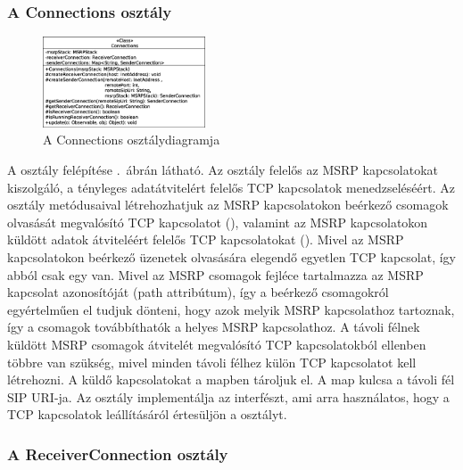 \subsubsection*{A Connections osztály}
\label{sec:msrp_connections}

\begin{figure}
  \vspace{-15pt}
  \begin{center}
    \includegraphics[width=0.43\textwidth]{img/class_diagrams/Connections.eps}
  \end{center}
  \vspace{-15pt}
  \captionsetup{font=scriptsize}
  \caption{A Connections osztálydiagramja}
   \label{fig:class_connections}
  \vspace{-10pt}
\end{figure}
A  osztály felépítése .~ábrán látható. Az osztály felelős az MSRP kapcsolatokat kiszolgáló, a tényleges adatátvitelért felelős TCP kapcsolatok menedzseléséért. Az osztály metódusaival létrehozhatjuk az MSRP kapcsolatokon beérkező csomagok olvasását megvalósító TCP kapcsolatot (), valamint az MSRP kapcsolatokon küldött adatok átviteléért felelős TCP kapcsolatokat (). Mivel az MSRP kapcsolatokon beérkező üzenetek olvasására elegendő egyetlen TCP kapcsolat, így abból csak egy van. Mivel az MSRP csomagok fejléce tartalmazza az MSRP kapcsolat azonosítóját (path attribútum), így a beérkező csomagokról egyértelműen el tudjuk dönteni, hogy azok melyik MSRP kapcsolathoz tartoznak, így a csomagok továbbíthatók a helyes MSRP kapcsolathoz. A távoli félnek küldött MSRP csomagok átvitelét megvalósító TCP kapcsolatokból ellenben többre van szükség, mivel minden távoli félhez külön TCP kapcsolatot kell létrehozni. A küldő kapcsolatokat a  mapben tároljuk el. A map kulcsa a távoli fél SIP URI-ja. Az osztály implementálja az  interfészt, ami arra használatos, hogy a TCP kapcsolatok leállításáról értesüljön a  osztályt.

\subsubsection*{A ReceiverConnection osztály}
\label{sec:msrp_receiverconnection}

